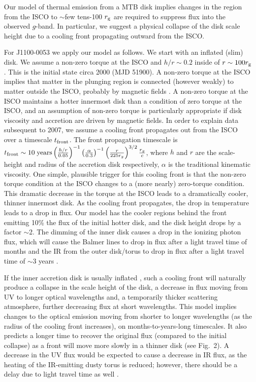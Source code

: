 \documentclass{nature}
\begin{document}
Our model of thermal emission from a MTB disk implies changes in the region from the ISCO to $\sim$few tens-100 $r_{\rm g}$ are required to suppress flux into the observed $g$-band. In particular, we suggest a physical collapse of the disk scale height due to a cooling front propagating outward from the ISCO.

For J1100-0053 we apply our model as follows. We start with an inflated (slim) disk. We assume a non-zero torque at the ISCO and $h/r\sim0.2$ inside of $r\sim100 r_{\rm g}$. This is the initial state circa 2000 (MJD 51900). A non-zero torque at the ISCO implies that matter in the plunging region is connected (however weakly) to matter outside the ISCO, probably by magnetic fields \cite[e.g., ][]{Gammie1999, Agol_Krolik2000}. A non-zero torque at the ISCO maintains a hotter innermost disk than a condition of zero torque at the ISCO, and an assumption of non-zero torque is particularly appropriate if disk viscosity and accretion are driven by magnetic fields. In order to explain data subsequent to 2007, we assume a cooling front propagates out from the ISCO over a timescale $t_{\rm front}$. The front propagation timescale is $ t_{\rm front}  \sim  10 \; {\rm years} \left(\frac{h/r}{0.05}\right)^{-1}  \left(\frac{\alpha}{0.3}\right)^{-1}   \left(\frac{r}{225r_{g}}\right)^{3/2}  \frac{r_{g}}{c}$, where $h$ and $r$ are the scale-height and radius of the accretion disk respectively, $\alpha$ is the traditional kinematic viscosity. One simple, plausible trigger for this cooling front is that the non-zero torque condition at the ISCO changes to a (more nearly) zero-torque condition. This dramatic decrease in the torque at the ISCO leads to a dramatically cooler, thinner innermost disk. As the cooling front propagates, the drop in temperature leads to a drop in flux. Our model has the cooler regions behind the front emitting 10\% the flux of the initial hotter disk, and the disk height drops by a factor $\sim$2. The dimming of the inner disk causes a drop in the ionizing photon flux, which will cause the Balmer lines to drop in flux after a light travel time of months and the IR from the outer disk/torus to drop in flux after a light travel time of $\sim$3 years \citep{Sirko_Goodman2003, Jun2015}. 

If the inner accretion disk is usually inflated \cite[see e.g., ][]{Sirko_Goodman2003, Thompson2005, Hopkins_Quataert2011}, such a cooling front will naturally produce a collapse in the scale height of the disk, a decrease in flux moving from UV to longer optical wavelengths and, a temporarily thicker scattering atmosphere, further decreasing flux at short wavelengths.  This model implies changes to the optical emission moving from shorter to longer wavelengths (as the radius of the cooling front increases), on months-to-years-long timescales. It also predicts a longer time to recover the original flux (compared to the initial collapse) as a front will move more slowly in a thinner disk (see Fig.~2). A decrease in the UV flux would be expected to cause a decrease in IR flux, as the heating of the IR-emitting dusty torus is reduced; however, there should be a delay due to light travel time as well \cite[e.g., ][]{Jun2015}.
\end{document}
